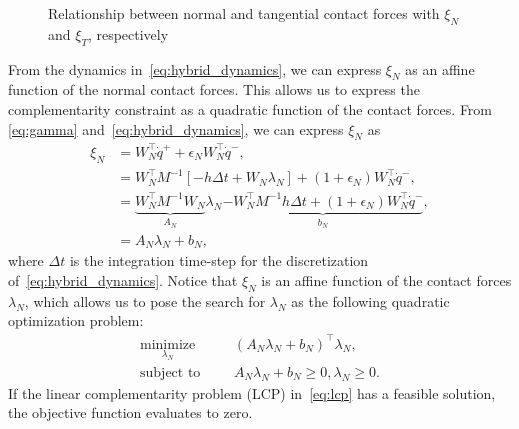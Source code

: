 %
\begin{figure}[tb]
  \centering
  \caption{Relationship between normal and tangential contact forces with $\xi_N$ and $\xi_T$, respectively}
  \label{fig:unilateral_primitive}
\end{figure}
%

From the dynamics in~\eqref{eq:hybrid_dynamics}, we can express $\xi_N$ as an
affine function of the normal contact forces. 
%
This allows us to express the complementarity constraint as a quadratic function
of the contact forces.
%
From \eqref{eq:gamma} and~\eqref{eq:hybrid_dynamics}, we can express $\xi_N$
as 
\begin{align*}
  \xi_N &= W_N^\top \dot{q}^+ + \epsilon_N W_N^\top \dot{q}^-, \\
  &= W_N^\top M^{-1}[-h \Delta t + W_N \lambda_N] + (1 + \epsilon_N)W_N^\top \dot{q}^-, \\
  &= \underbrace{W_N^\top M^{-1}W_N}_{A_N} \lambda_N \underbrace{-W_N^\top M^{-1}h \Delta t + (1 + \epsilon_N) W_N^\top \dot{q}^-}_{b_N}, \\
  &= A_N \lambda_N + b_N,
\end{align*}
\noindent where $\Delta t$ is the integration time-step for the discretization
of~\eqref{eq:hybrid_dynamics}.
%
Notice that $\xi_N$ is an affine function of the contact forces $\lambda_N$,
which allows us to pose the search for $\lambda_N$ as the following quadratic
optimization problem:
\begin{equation}
  \begin{aligned}
      \underset{\lambda_N}{\textrm{minimize}} 
      & & &(A_N \lambda_N + b_N)^\top \lambda_N, \\%
      \textrm{subject to}
      & & &A_N \lambda_N + b_N \geq 0, \lambda_N \geq 0.
  \end{aligned}
  \label{eq:lcp}
\end{equation}
\noindent If the linear complementarity problem (LCP) in~\eqref{eq:lcp} has a
feasible solution, the objective function evaluates to zero.

